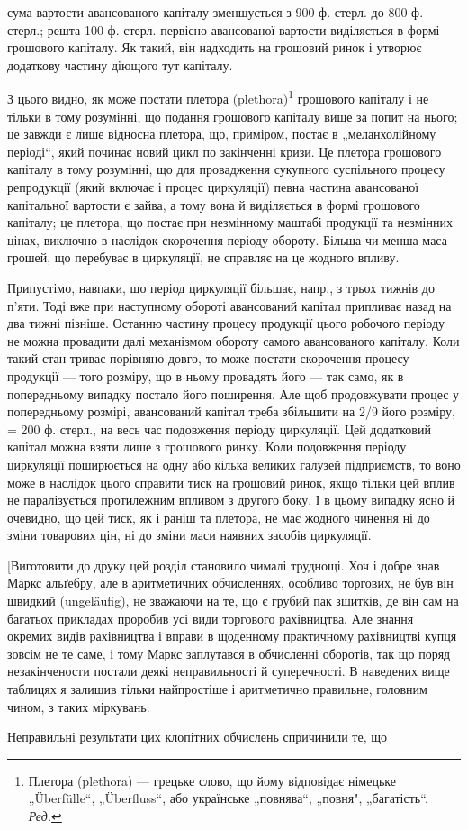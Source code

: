 \parcont{}  %
сума вартости авансованого капіталу зменшується з 900 ф. стерл. до
800 ф. стерл.; решта 100 ф. стерл. первісно авансованої вартости виділяється
в формі грошового капіталу. Як такий, він надходить на грошовий
ринок і утворює додаткову частину діющого тут капіталу.

З цього видно, як може постати плетора (plethora)\footnote*{
Плетора (plethora) — грецьке слово, що йому відповідає німецьке „Überfülle“,
„Überfluss“, або українське „повнява“, „повня", „багатість“. \emph{Ред.}
} грошового капіталу
і не тільки в тому розумінні, що подання грошового капіталу вище
за попит на нього; це завжди є лише відносна плетора, що, приміром,
постає в „меланхолійному періоді“, який починає новий цикл по
закінченні кризи. Це плетора грошового капіталу в тому розумінні, що
для провадження сукупного суспільного процесу репродукції (який включає
і процес циркуляції) певна частина авансованої капітальної вартости
є зайва, а тому вона й виділяється в формі грошового капіталу; це плетора,
що постає при незмінному маштабі продукції та незмінних цінах,
виключно в наслідок скорочення періоду обороту. Більша чи менша маса
грошей, що перебуває в циркуляції, не справляє на це жодного впливу.

Припустімо, навпаки, що період циркуляції більшає, напр., з трьох
тижнів до п’яти. Тоді вже при наступному обороті авансований капітал
припливає назад на два тижні пізніше. Останню частину процесу продукції
цього робочого періоду не можна провадити далі механізмом обороту
самого авансованого капіталу. Коли такий стан триває порівняно довго,
то може постати скорочення процесу продукції — того розміру, що в
ньому провадять його — так само, як в попередньому випадку постало
його поширення. Але щоб продовжувати процес у попередньому розмірі,
авансований капітал треба збільшити на 2/9 його розміру, = 200 ф.
стерл., на весь час подовження періоду циркуляції. Цей додатковий капітал
можна взяти лише з грошового ринку. Коли подовження періоду
циркуляції поширюється на одну або кілька великих галузей підприємств,
то воно може в наслідок цього справити тиск на грошовий ринок, якщо
тільки цей вплив не паралізується протилежним впливом з другого боку.
І в цьому випадку ясно й очевидно, що цей тиск, як і раніш та плетора,
не має жодного чинення ні до зміни товарових цін, ні до зміни маси
наявних засобів циркуляції.

[Виготовити до друку цей розділ становило чималі труднощі. Хоч і
добре знав Маркс альґебру, але в аритметичних обчисленнях, особливо
торгових, не був він швидкий (ungeläufig), не зважаючи на те, що є грубий
пак зшитків, де він сам на багатьох прикладах проробив усі види торгового
рахівництва. Але знання окремих видів рахівництва і вправи в
щоденному практичному рахівництві купця зовсім не те саме, і тому
Маркс заплутався в обчисленні оборотів, так що поряд незакінчености
постали деякі неправильності й суперечності. В наведених вище таблицях
я залишив тільки найпростіше і аритметично правильне, головним чином,
з таких міркувань.

Неправильні результати цих клопітних обчислень спричинили те, що
\parbreak{}  %

